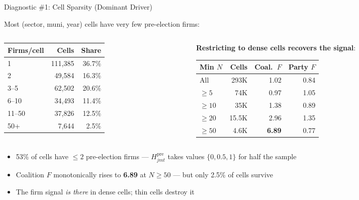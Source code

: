 \documentclass[aspectratio=169,11pt]{beamer}
\begin{document}
\begin{frame}[shrink=8]{Diagnostic \#1: Cell Sparsity (Dominant Driver)}

Most (sector, muni, year) cells have very few pre-election firms:

\smallskip

\begin{columns}[T]
\begin{column}{0.45\textwidth}
\centering
\scriptsize
\begin{tabular}{l r r}
\toprule
\textbf{Firms/cell} & \textbf{Cells} & \textbf{Share} \\
\midrule
1       & 111,385 & 36.7\% \\
2       & 49,584  & 16.3\% \\
3--5    & 62,502  & 20.6\% \\
6--10   & 34,493  & 11.4\% \\
11--50  & 37,826  & 12.5\% \\
50+     & 7,644   & 2.5\% \\
\bottomrule
\end{tabular}
\end{column}
\begin{column}{0.5\textwidth}
\centering
\scriptsize
\textbf{Restricting to dense cells recovers the signal}:

\smallskip
\begin{tabular}{l r r r}
\toprule
\textbf{Min $N$} & \textbf{Cells} & \textbf{Coal.\ $F$} & \textbf{Party $F$} \\
\midrule
All     & 293K  & 1.02 & 0.84 \\
$\geq 5$  & 74K   & 0.97 & 1.05 \\
$\geq 10$ & 35K   & 1.38 & 0.89 \\
$\geq 20$ & 15.5K & 2.96 & 1.35 \\
$\geq 50$ & 4.6K  & \textbf{6.89} & 0.77 \\
\bottomrule
\end{tabular}
\end{column}
\end{columns}

\medskip

\begin{itemize}\setlength{\itemsep}{2pt}
    \item 53\% of cells have $\leq 2$ pre-election firms --- $H^{\mathrm{pre}}_{jmt}$ takes values $\{0, 0.5, 1\}$ for half the sample
    \item Coalition $F$ monotonically rises to \textbf{6.89} at $N \geq 50$ --- but only 2.5\% of cells survive
    \item The firm signal \emph{is there} in dense cells; thin cells destroy it
\end{itemize}

\end{frame}
\end{document}
